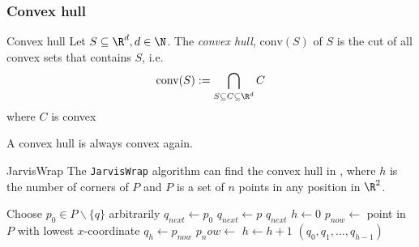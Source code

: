\newpage
\subsubsection{Convex hull}
\begin{definition}[]{Convex hull}
    Let $S \subseteq \R^d, d \in \N$. The \textit{convex hull}, $\text{conv}(S)$ of $S$ is the cut of all convex sets that contains $S$, i.e.
    \begin{align*}
        \text{conv}(S) := \bigcap_{S\subseteq C \subseteq \R^d} C
    \end{align*}
    where $C$ is convex
\end{definition}
A convex hull is always convex again.


\setcounter{all}{37}
\begin{theorem}[]{JarvisWrap}
    The \verb|JarvisWrap| algorithm can find the convex hull in , where $h$ is the number of corners of $P$ and $P$ is a set of $n$ points in any position in $\R^2$.
\end{theorem}


\begin{algorithm}
    \caption{JarvisWrap}
    \begin{algorithmic}[1]
            \State Choose $p_0 \in P\backslash\{q\}$ arbitrarily
            \State $q_{next} \gets p_0$
                    $q_{next} \gets p$ 
                \EndIf
            \EndFor
            \State \Return $q_{next}$
        \EndProcedure
            \State $h \gets 0$
            \State $p_{now} \gets$ point in $P$ with lowest $x$-coordinate
                \State $q_h \gets p_{now}$
                \State $p_now \gets$ 
                \State $h \gets h + 1$
            \EndWhile
            \State \Return $(q_0, q_1, \ldots, q_{h - 1})$
        \EndProcedure
    \end{algorithmic}
\end{algorithm}


